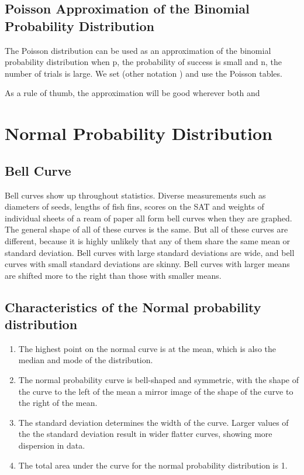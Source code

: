 \subsection{Poisson Approximation of the Binomial Probability Distribution}

The Poisson distribution can be used  as an approximation of the binomial probability distribution when p, the probability of success is small and n, the number of trials is large.
We set   (other notation  )  and use the Poisson tables. 
 
As a rule of thumb, the approximation will be good wherever both  and  
 

\newpage
\section{Normal Probability Distribution}

\subsection{Bell Curve}
Bell curves show up throughout statistics. Diverse measurements such as diameters of seeds, lengths of fish fins, scores on the SAT and weights of individual sheets of a ream of paper all form bell curves when they are graphed. The general shape of all of these curves is the same. But all of these curves are different, because it is highly unlikely that any of them share the same mean or standard deviation. Bell curves with large standard deviations are wide, and bell curves with small standard deviations are skinny. Bell curves with larger means are shifted more to the right than those with smaller means.

\subsection*{Characteristics of the Normal probability distribution}

\begin{enumerate}
\item The highest point on the normal curve is at the mean, which is also the median and mode of the distribution.

\item The normal probability curve is bell-shaped and symmetric, with the shape of the curve to the left of the mean a mirror image of the shape of the curve to the right of the mean.

\item The standard deviation determines the width of the curve. Larger values of the the standard deviation result in wider flatter curves, showing more dispersion in data.

\item The total area under the curve for the normal probability distribution is 1.
\end{enumerate}